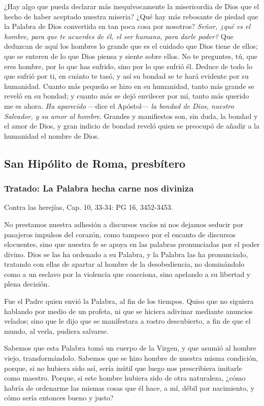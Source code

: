 ¿Hay algo que pueda declarar más inequívocamente la misericordia de Dios que el hecho de haber aceptado nuestra miseria? ¿Qué hay más rebosante de piedad que la Palabra de Dios convertida en tan poca cosa por nosotros? \emph{Señor, ¿qué es el hombre, para que te acuerdes de él, el ser humano, para darle poder?} Que deduzcan de aquí los hombres lo grande que es el cuidado que Dios tiene de ellos; que se enteren de lo que Dios piensa y siente sobre ellos. No te preguntes, tú, que eres hombre, por lo que has sufrido, sino por lo que sufrió él. Deduce de todo lo que sufrió por ti, en cuánto te tasó, y así su bondad se te hará evidente por su humanidad. Cuanto más pequeño se hizo en su humanidad, tanto más grande se reveló en su bondad; y cuanto más se dejó envilecer por mí, tanto más querido me es ahora. \emph{Ha aparecido} ---dice el Apóstol--- \emph{la bondad de Dios, nuestro Salvador, y su amor al hombre}. Grandes y manifiestos son, sin duda, la bondad y el amor de Dios, y gran indicio de bondad reveló quien se preocupó de añadir a la humanidad el nombre de Dios.

\subsection{San Hipólito de Roma, presbítero}

\subsubsection{Tratado: La Palabra hecha carne nos diviniza}

Contra las herejías, Cap. 10, 33-34: PG 16, 3452-3453.

No prestamos nuestra adhesión a discursos vacíos ni nos dejamos seducir por pasajeros impulsos del corazón, como tampoco por el encanto de discursos elocuentes, sino que nuestra fe se apoya en las palabras pronunciadas por el poder divino. Dios se las ha ordenado a su Palabra, y la Palabra las ha pronunciado, tratando con ellas de apartar al hombre de la desobediencia, no dominándolo como a un esclavo por la violencia que coacciona, sino apelando a su libertad y plena decisión.

Fue el Padre quien envió la Palabra, al fin de los tiempos. Quiso que no siguiera hablando por medio de un profeta, ni que se hiciera adivinar mediante anuncios velados; sino que le dijo que se manifestara a rostro descubierto, a fin de que el mundo, al verla, pudiera salvarse.

Sabemos que esta Palabra tomó un cuerpo de la Virgen, y que asumió al hombre viejo, transformándolo. Sabemos que se hizo hombre de nuestra misma condición, porque, si no hubiera sido así, sería inútil que luego nos prescribiera imitarle como maestro. Porque, si este hombre hubiera sido de otra naturaleza, ¿cómo habría de ordenarme las mismas cosas que él hace, a mí, débil por nacimiento, y cómo sería entonces bueno y justo?

